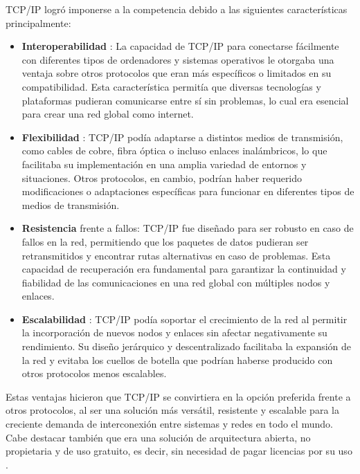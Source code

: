 TCP/IP logró imponerse a la competencia debido a las siguientes características principalmente:
\begin{itemize}
      \item \textbf{ Interoperabilidad }: La capacidad de TCP/IP para conectarse fácilmente con diferentes tipos de ordenadores y sistemas operativos le otorgaba una ventaja sobre otros protocolos que eran más específicos o limitados en su compatibilidad. Esta característica permitía que diversas tecnologías y plataformas pudieran comunicarse entre sí sin problemas, lo cual era esencial para crear una red global como internet.

      \item \textbf{ Flexibilidad }: TCP/IP podía adaptarse a distintos medios de transmisión, como cables de cobre, fibra óptica o incluso enlaces inalámbricos, lo que facilitaba su implementación en una amplia variedad de entornos y situaciones. Otros protocolos, en cambio, podrían haber requerido modificaciones o adaptaciones específicas para funcionar en diferentes tipos de medios de transmisión.

      \item \textbf{ Resistencia }frente a fallos: TCP/IP fue diseñado para ser robusto en caso de fallos en la red, permitiendo que los paquetes de datos pudieran ser retransmitidos y encontrar rutas alternativas en caso de problemas. Esta capacidad de recuperación era fundamental para garantizar la continuidad y fiabilidad de las comunicaciones en una red global con múltiples nodos y enlaces.

      \item \textbf{ Escalabilidad }: TCP/IP podía soportar el crecimiento de la red al permitir la incorporación de nuevos nodos y enlaces sin afectar negativamente su rendimiento. Su diseño jerárquico y descentralizado facilitaba la expansión de la red y evitaba los cuellos de botella que podrían haberse producido con otros protocolos menos escalables.

\end{itemize}

Estas ventajas hicieron que TCP/IP se convirtiera en la opción preferida frente a otros protocolos, al ser una solución más versátil,
resistente y escalable para la creciente demanda de interconexión entre sistemas y redes en todo el mundo.
Cabe destacar también que era una solución de arquitectura abierta, no propietaria y de uso gratuito, es decir, sin necesidad de pagar licencias por su uso \cite{edwardsFoundationInternetTCP2021}.


